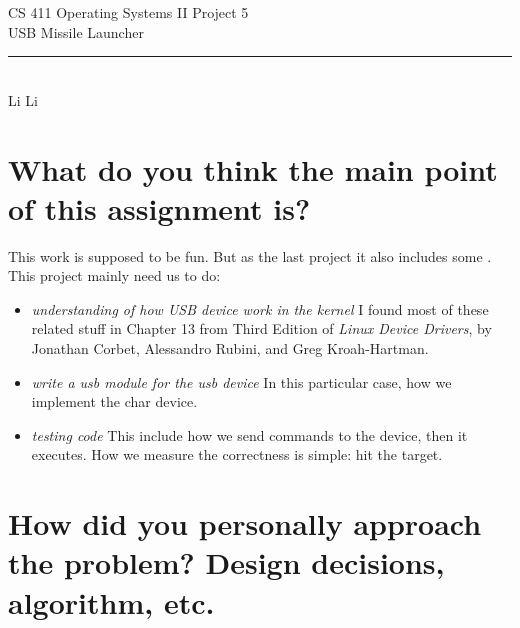 \documentclass[12pt,letterpaper]{article}
\begin{document}
\begin{titlepage}
    \vspace*{4cm}
    \begin{flushleft}
    {\huge
        CS 411 Operating Systems II Project 5\\[.5cm]
    }
    {\large
         USB Missile Launcher
    }
    \end{flushleft}
    \vfill
    \rule{5in}{.5mm}\\
    Li Li

\end{titlepage}
\section{What do you think the main point of this assignment is?}
\indent This work is supposed to be fun. But as the last project it also includes some . This project mainly need us to do:
\begin{itemize}
\item \emph{understanding of how USB device work in the kernel}  I found most of these related stuff in Chapter 13 from Third Edition of \emph{Linux Device Drivers}, by Jonathan Corbet, Alessandro Rubini, and Greg Kroah-Hartman.
\item \emph{write a usb module for the usb device} In this particular case, how we implement the char device.
\item \emph{testing code} This include how we send commands to the device, then it executes. How we measure the correctness is simple: hit the target.
\end{itemize}


\section{How did you personally approach the problem? Design decisions, algorithm, etc.}
\end{document}
